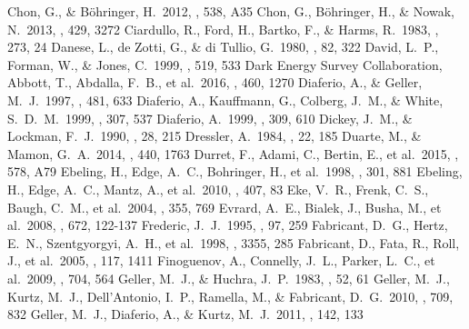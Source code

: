 \documentclass[iop, apj]{emulateapj}
\begin{document}
\begin{thebibliography}{}
 Chon, G., \& B{\"o}hringer, H.\ 2012, \aap, 538, A35 
 Chon, G., B{\"o}hringer, H., \& Nowak, N.\ 2013, \mnras, 429, 3272  
 Ciardullo, R., Ford, H., Bartko, F., \& Harms, R.\ 1983, \apj, 273, 24  
 Danese, L., de Zotti, G., \& di Tullio, G.\ 1980, \aap, 82, 322  
 David, L.~P., Forman, W., \& Jones, C.\ 1999, \apj, 519, 533 
 Dark Energy Survey Collaboration, Abbott, T., Abdalla, F.~B., et al.\ 2016, \mnras, 460, 1270   
 Diaferio, A., \& Geller, M.~J.\ 1997, \apj, 481, 633  
 Diaferio, A., Kauffmann, G., Colberg, J.~M., \& White, S.~D.~M.\ 1999, \mnras, 307, 537   
 Diaferio, A.\ 1999, \mnras, 309, 610 
 Dickey, J.~M., \& Lockman, F.~J.\ 1990, \araa, 28, 215   
Dressler, A.\ 1984, \araa, 22, 185  
 Duarte, M., \& Mamon, G.~A.\ 2014, \mnras, 440, 1763 
 Durret, F., Adami, C., Bertin, E., et al.\ 2015, \aap, 578, A79  
 Ebeling, H., Edge, A.~C., Bohringer, H., et al.\ 1998, \mnras, 301, 881 
 Ebeling, H., Edge, A.~C., Mantz, A., et al.\ 2010, \mnras, 407, 83  
 Eke, V.~R., Frenk, C.~S., Baugh, C.~M., et al.\ 2004, \mnras, 355, 769  
 Evrard, A.~E., Bialek, J., Busha, M., et al.\ 2008, \apj, 672, 122-137 
 Frederic, J.~J.\ 1995, \apjs, 97, 259   
 Fabricant, D.~G., Hertz, E.~N., Szentgyorgyi, A.~H., et al.\ 1998, \procspie, 3355, 285 
 Fabricant, D., Fata, R., Roll, J., et al.\ 2005, \pasp, 117, 1411 
 Finoguenov, A., Connelly, J.~L., Parker, L.~C., et al.\ 2009, \apj, 704, 564 
 Geller, M.~J., \& Huchra, J.~P.\ 1983, \apjs, 52, 61 
 Geller, M.~J., Kurtz, M.~J., Dell'Antonio, I.~P., Ramella, M., \& Fabricant, D.~G.\ 2010, \apj, 709, 832 
 Geller, M.~J., Diaferio, A., \& Kurtz, M.~J.\ 2011, \aj, 142, 133

\end{thebibliography}
\end{document}
